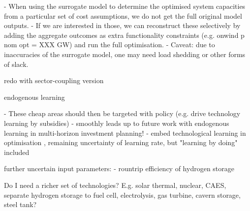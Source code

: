- When using the surrogate model to determine the optimised system capacities
from a particular set of cost assumptions, we do not get the full original model outputs.
- If we are interested in those, we can reconstruct these selectively
by adding the aggregate outcomes as extra  functionality constraints (e.g. onwind p nom opt = XXX GW) and run the full optimisation.
- Caveat: due to inaccuracies  of the surrogate model, one may need load shedding or other forms of slack.

redo with sector-coupling version

endogenous learning

- These cheap areas should then be targeted with policy (e.g. drive technology learning by subsidies)
- smoothly leads up to future work with endogenous learning in multi-horizon investment planning!
- embed technological learning in optimisation \cite{heuberger_power_2017} \cite{lopion_cost_2019}, remaining uncertainty of learning rate, but "learning by doing" included

further uncertain input parameters:
- rountrip efficiency of hydrogen storage

Do I need a richer set of technologies? E.g.
solar thermal, nuclear, CAES, separate hydrogen storage to fuel cell, electrolysis, gas turbine, cavern storage, steel tank?
